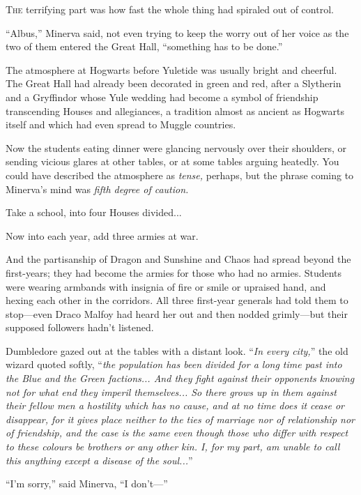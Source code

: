 
\lettrine[nindent=0pt]{T}{he} terrifying part was how fast the whole thing had spiraled out of control.

“Albus,” Minerva said, not even trying to keep the worry out of her voice as the two of them entered the Great Hall, “something has to be done.”

The atmosphere at Hogwarts before Yuletide was usually bright and cheerful. The Great Hall had already been decorated in green and red, after a Slytherin and a Gryffindor whose Yule wedding had become a symbol of friendship transcending Houses and allegiances, a tradition almost as ancient as Hogwarts itself and which had even spread to Muggle countries.

Now the students eating dinner were glancing nervously over their shoulders, or sending vicious glares at other tables, or at some tables arguing heatedly. You could have described the atmosphere as \emph{tense,} perhaps, but the phrase coming to Minerva’s mind was \emph{fifth degree of caution.}

Take a school, into four Houses divided...

Now into each year, add three armies at war.

And the partisanship of Dragon and Sunshine and Chaos had spread beyond the first-years; they had become the armies for those who had no armies. Students were wearing armbands with insignia of fire or smile or upraised hand, and hexing each other in the corridors. All three first-year generals had told them to stop—even Draco Malfoy had heard her out and then nodded grimly—but their supposed followers hadn’t listened.

Dumbledore gazed out at the tables with a distant look. “\emph{In every city,}” the old wizard quoted softly, “\emph{the population has been divided for a long time past into the Blue and the Green factions... And they fight against their opponents knowing not for what end they imperil themselves... So there grows up in them against their fellow men a hostility which has no cause, and at no time does it cease or disappear, for it gives place neither to the ties of marriage nor of relationship nor of friendship, and the case is the same even though those who differ with respect to these colours be brothers or any other kin. I, for my part, am unable to call this anything except a disease of the soul...}”

“I’m sorry,” said Minerva, “I don’t—”

